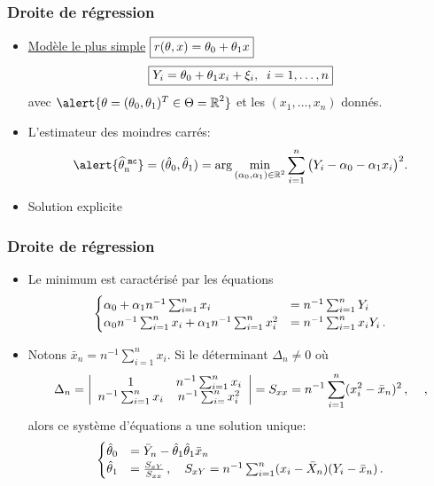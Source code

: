 \begin{frame}
\frametitle{Droite de régression}
\begin{itemize}
\item \underline{Modèle le plus simple}
$\boxed{r(\theta,x)= \theta_0 + \theta_1 x}$
$$\boxed{Y_i = \theta_0 + \theta_1 x_i+\xi_i,\;\;i=1,\ldots,n}$$
avec $\alert{\truetheta = (\truetheta_0,\truetheta_1)^T \in \Theta = \R^2}$ et les
$(x_1,\ldots, x_n)$ donnés.
\item L'estimateur des moindres carrés:
$$\alert{\estMC}=(\hat{\truetheta}_0, \hat{\truetheta}_1) =
\arg \min_{(\curtheta_0,\curtheta_1)\in \R^2}\sum_{i = 1}^n \big(Y_i- \curtheta_0 - \curtheta_1 x_i\big)^2.
$$
\item \alert{Solution explicite}
\end{itemize}
\end{frame}

\begin{frame}
\frametitle{Droite de régression}
\begin{itemize}
\item  Le minimum est caractérisé par les équations
\[
\begin{cases}
\alpha_0 + \alpha_1 n^{-1} \sum_{i=1}^n x_i &= n^{-1} \sum_{i=1}^n Y_i \\
\alpha_0 n^{-1} \sum_{i=1}^n x_i + \alpha_1 n^{-1} \sum_{i=1}^n x_i^2 &= n^{-1} \sum_{i=1}^n x_i Y_i \,.
\end{cases}
\]
\item Notons $\bar{x}_n = n^{-1} \sum_{i=1}^n x_i$. Si le déterminant $\Delta_n \ne 0$ où
\[
\Delta_n = \left|
                 \begin{array}{cc}
                   1 & n^{-1} \sum_{i=1}^n x_i \\
                   n^{-1} \sum_{i=1}^n x_i &  n^{-1} \sum_{i=}^n x_i^2 \\
                 \end{array}
\right| = S_{xx} = n^{-1} \sum_{i=1}^n (x_i^2 - \bar{x}_n)^2 \,,  \quad  \,,
\]
alors ce système d'équations a une solution unique:
\[
\begin{cases}
\hat{\theta}_0 &= \bar{Y}_n - \hat{\theta}_1 \hat{\theta}_1 \bar{x}_n  \\
\hat{\theta}_1 &= \frac{S_{xY}}{S_{xx}} \,, \quad S_{xY}= n^{-1} \sum_{i=1}^n (x_i - \bar{X}_n) (Y_i - \bar{x}_n) \,.
\end{cases}
\]
\end{itemize}
\end{frame}

